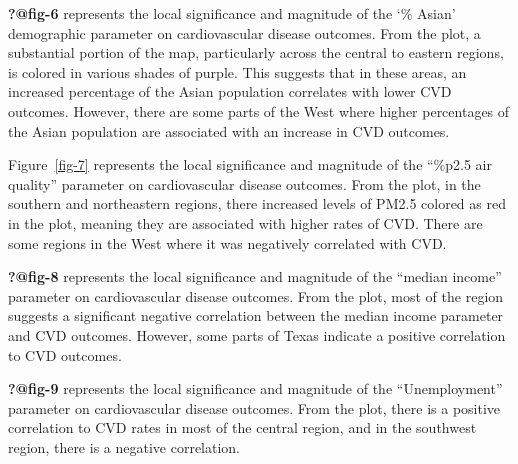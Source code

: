 \documentclass[
]{article}
\begin{document}
\textbf{?@fig-6} represents the local significance and magnitude of the
`\% Asian' demographic parameter on cardiovascular disease outcomes.
From the plot, a substantial portion of the map, particularly across the
central to eastern regions, is colored in various shades of purple. This
suggests that in these areas, an increased percentage of the Asian
population correlates with lower CVD outcomes. However, there are some
parts of the West where higher percentages of the Asian population are
associated with an increase in CVD outcomes.~

Figure~\ref{fig-7} represents the local significance and magnitude of
the ``\%p2.5 air quality'' parameter on cardiovascular disease outcomes.
From the plot, in the southern and northeastern regions, there increased
levels of PM2.5 colored as red in the plot, meaning they are associated
with higher rates of CVD. There are some regions in the West where it
was negatively correlated with CVD.

\textbf{?@fig-8} represents the local significance and magnitude of the
``median income'' parameter on cardiovascular disease outcomes. From the
plot, most of the region suggests a significant negative correlation
between the median income parameter and CVD outcomes. However, some
parts of Texas indicate a positive correlation to CVD outcomes.~

\textbf{?@fig-9} represents the local significance and magnitude of the
``Unemployment'' parameter on cardiovascular disease outcomes. From the
plot, there is a positive correlation to CVD rates in most of the
central region, and in the southwest region, there is a negative
correlation.
\end{document}
